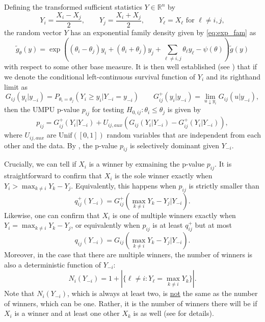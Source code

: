 \documentclass{article}
\newcommand{\R}{\mathbb{R}}
\begin{document}
Defining the transformed sufficient statistics $Y \in \R^n$ by
\begin{equation}
    \label{eq:reparam}
    Y_i = \frac{X_i - X_j}{2}, \qquad  Y_j = \frac{X_i + X_j}{2}, \qquad  Y_{\ell} = X_{\ell} \text{ for } \ell \neq i, j,
\end{equation}
the random vector $Y$ has an exponential family density given by \eqref{eq:exp_fam} as 
\begin{equation}
    \label{eq:exp_fam}
    \tilde{g}_{\theta}(y) = \exp\left( (\theta_i - \theta_j) y_i + (\theta_i + \theta_j) y_j + \sum_{\ell \neq i, j} \theta_{\ell} y_{\ell} - \psi(\theta)  \right)\tilde{g}(y)
\end{equation}
with respect to some other base measure. It is then well established (see ) that if we denote the conditional left-continuous survival function of $Y_i$ and its righthand limit as
\begin{equation}
    G_{ij}(y_i | y_{-i}) = P_{\theta_i = \theta_j}(Y_i \geq y_i | Y_{-i} = y_{-i}) \qquad G_{ij}^+(y_i |y_{-i}) = \lim_{u \downarrow y_i } G_{ij}(u | y_{-i}),
\end{equation}
then the UMPU p-value $p_{ij}$ for testing $H_{0, ij}: \theta_i \leq \theta_j$ is given by 
\begin{equation}
    \label{eq:umpu_rank_verification}
    p_{ij} = G^+_{ij}(Y_i | Y_{-i}) + U_{ij, aux}(G_{ij}(Y_{i}|Y_{-i}) - G^+_{ij}(Y_i|Y_{-i})),
\end{equation}
where $U_{ij, aux}$ are $\text{Unif}([0, 1])$ random variables that are independent from each other and the data. By , the p-value $p_{ij}$ is selectively dominant given $Y_{-i}$. 

Crucially, we can tell if $X_i$ is a winner by exmaining the p-value $p_{ij}$. It is straightforward to confirm that $X_i$ is the sole winner exactly when $Y_i > \max_{k \neq i } Y_k - Y_j $. Equivalently, this happens when $p_{ij}$ is strictly smaller than 
\begin{equation}
    \label{eq:rank_verification_lower}
    q^+_{ij}(Y_{-i}) = G^+_{ij}(\max_{k \neq i} Y_k - Y_j | Y_{-i}).
\end{equation}
Likewise, one can confirm that $X_i$ is one of multiple winners exactly when $Y_i = \max_{k \neq i } Y_k - Y_j$, or equivalently when $p_{ij}$ is at least $q^+_{ij}$ but at most 
\begin{equation}
    \label{eq:rank_verification_upper}
    q_{ij}(Y_{-i}) = G_{ij}(\max_{k \neq i} Y_k - Y_j | Y_{-i}).
\end{equation}
Moreover, in the case that there are multiple winners, the number of winners is also a deterministic function of $Y_{-i}$:
\begin{equation}
    \label{eq:rank_verification_num_ties}
    N_{i}(Y_{-i}) = 1 + | \{ \ell \neq i : Y_{\ell} = \max_{k \neq i} Y_k  \} |.
\end{equation}
Note that $N_{i}(Y_{-i})$, which is always at least two, is \underline{not} the same as the number of winners, which can be one. Rather, it is the number of winners there will be if $X_i$ is a winner and at least one other $X_k$ is as well (see  for details).  
\end{document}
